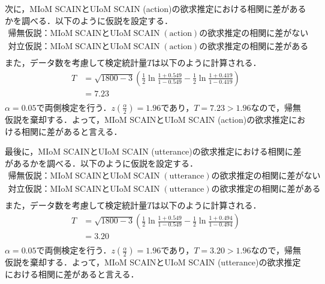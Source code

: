 \par
次に，MIoM SCAINとUIoM SCAIN (action)の欲求推定における相関に差があるかを調べる．以下のように仮説を設定する．
\begin{displaymath}
  \begin{split}
  \label{z_a_b}
  \mathrm{帰無仮説：MIoM\; SCAINとUIoM\; SCAIN\; (action)の欲求推定の相関に差がない}\\
  \mathrm{対立仮説：MIoM\; SCAINとUIoM\; SCAIN\; (action)の欲求推定の相関に差がある}\\
  \end{split}
\end{displaymath}
また，データ数を考慮して検定統計量$T$は以下のように計算される．
\begin{displaymath}
  \begin{split}
  \label{z_a_b}
  T&=\sqrt{1800-3}\left(\frac{1}{2}\ln{\frac{1+0.549}{1-0.549}-\frac{1}{2}\ln{\frac{1+0.419}{1-0.419}}}\right)\\
  &=7.23\\
  \end{split}
\end{displaymath}
$\alpha=0.05$で両側検定を行う．$z\left(\frac{\alpha}{2}\right)=1.96$であり，$T=7.23>1.96$なので，帰無仮説を棄却する．よって，MIoM SCAINとUIoM SCAIN (action)の欲求推定における相関に差があると言える．

\par
最後に，MIoM SCAINとUIoM SCAIN (utterance)の欲求推定における相関に差があるかを調べる．以下のように仮説を設定する．
\begin{displaymath}
  \begin{split}
  \label{z_a_b}
  \mathrm{帰無仮説：MIoM\; SCAINとUIoM\; SCAIN\; (utterance)の欲求推定の相関に差がない}\\
  \mathrm{対立仮説：MIoM\; SCAINとUIoM\; SCAIN\; (utterance)の欲求推定の相関に差がある}\\
  \end{split}
\end{displaymath}
また，データ数を考慮して検定統計量$T$は以下のように計算される．
\begin{displaymath}
  \begin{split}
  \label{z_a_b}
  T&=\sqrt{1800-3}\left(\frac{1}{2}\ln{\frac{1+0.549}{1-0.549}-\frac{1}{2}\ln{\frac{1+0.494}{1-0.494}}}\right)\\
  &=3.20\\
  \end{split}
\end{displaymath}
$\alpha=0.05$で両側検定を行う．$z\left(\frac{\alpha}{2}\right)=1.96$であり，$T=3.20>1.96$なので，帰無仮説を棄却する．よって，MIoM SCAINとUIoM SCAIN (utterance)の欲求推定における相関に差があると言える．

